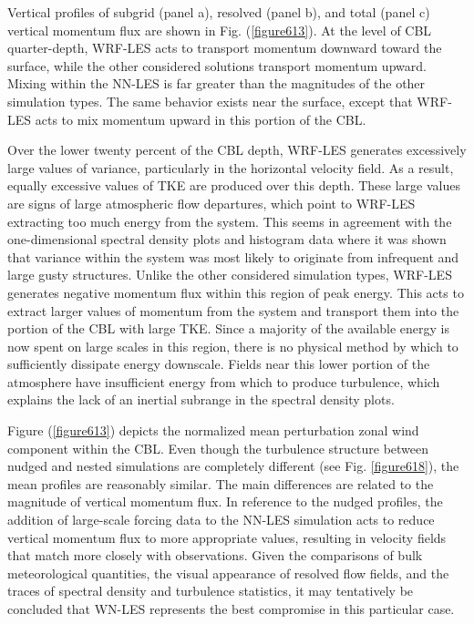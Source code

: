 Vertical profiles of subgrid (panel a), resolved (panel b), and total (panel c) vertical momentum flux are shown in Fig. (\autoref{figure613}). At the level of CBL quarter-depth, WRF-LES acts to transport momentum downward toward the surface, while the other considered solutions transport momentum upward. Mixing within the NN-LES is far greater than the magnitudes of the other simulation types. The same behavior exists near the surface, except that WRF-LES acts to mix momentum upward in this portion of the CBL.

Over the lower twenty percent of the CBL depth, WRF-LES generates excessively large values of variance, particularly in the horizontal velocity field. As a result, equally excessive values of TKE are produced over this depth. These large values are signs of large atmospheric flow departures, which point to WRF-LES extracting too much energy from the system. This seems in agreement with the one-dimensional spectral density plots and histogram data where it was shown that variance within the system was most likely to originate from infrequent and large gusty structures. Unlike the other considered simulation types, WRF-LES generates negative momentum flux within this region of peak energy. This acts to extract larger values of momentum from the system and transport them into the portion of the CBL with large TKE. Since a majority of the available energy is now spent on large scales in this region, there is no physical method by which to sufficiently dissipate energy downscale. Fields near this lower portion of the atmosphere have insufficient energy from which to produce turbulence, which explains the lack of an inertial subrange in the spectral density plots. 

Figure (\autoref{figure613}) depicts the normalized mean perturbation zonal wind component within the CBL. Even though the turbulence structure between nudged and nested simulations are completely different (see Fig. \autoref{figure618}), the mean profiles are reasonably similar. The main differences are related to the magnitude of vertical momentum flux. In reference to the nudged profiles, the addition of large-scale forcing data to the NN-LES simulation acts to reduce vertical momentum flux to more appropriate values, resulting in velocity fields that match more closely with observations. Given the comparisons of bulk meteorological quantities, the visual appearance of resolved flow fields, and the traces of spectral density and turbulence statistics, it may tentatively be concluded that WN-LES represents the best compromise in this particular case.


